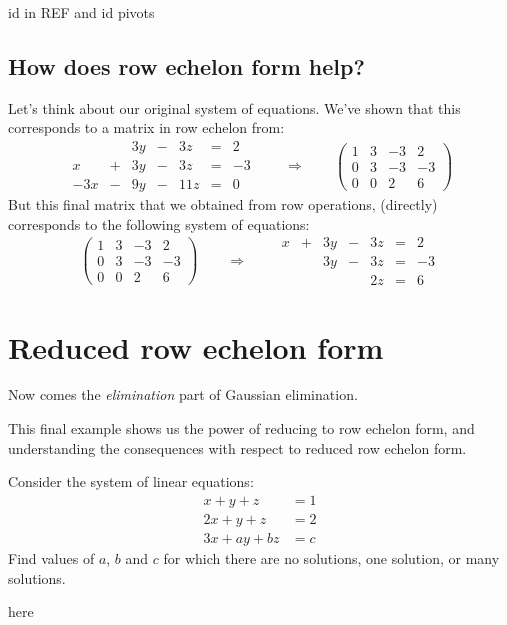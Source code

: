 \documentclass{ximera}
\begin{document}
\begin{question}
  id in REF and id pivots
\end{question}



\subsection{How does row echelon form help?}

Let's think about our original system of equations. We've shown that
this corresponds to a matrix in row echelon from:
\[
\begin{array}{ccccccc}
       & & 3y &-& 3z &=& 2 \\
     x& +&3y&-&3z&=&-3\\
     -3x& -&9y&-&11z&=&0
\end{array}
\qquad\Longrightarrow\qquad
\begin{pmatrix}
  1 &   3 & -3 & 2  \\
  0 &   3 & -3 & -3 \\
  0& 0  & 2 & 6
\end{pmatrix}
\]
But this final matrix that we obtained from row operations, (directly)
corresponds to the following system of equations:
\[
\left(\begin{array}{ccc|c}
  1 &   3 & -3 & 2  \\
  0 &   3 & -3 & -3 \\
  0& 0  & 2 & 6
\end{array}\right)
\qquad\Longrightarrow\qquad
\begin{array}{ccccccc}
     x  &+ & 3y &-& 3z &=& 2 \\
     &  &3y&-&3z&=&-3\\
     & & & &2z&=&6
\end{array}
\]

\section{Reduced row echelon form}


Now comes the \emph{elimination} part of Gaussian elimination. 



This final example shows us the power of reducing to row echelon form, and understanding the consequences with respect to reduced row echelon form.

\begin{example}
  Consider the system of linear equations:
  \begin{align*}
    x+y+z &=  1\\
    2x+y+z &=  2\\
    3x+ay+bz &= c
  \end{align*}
  Find values of $a$, $b$ and $c$ for which there are no solutions,
  one solution, or many solutions.
  \begin{solution}
    here
  \end{solution}
\end{example}
\end{document}
